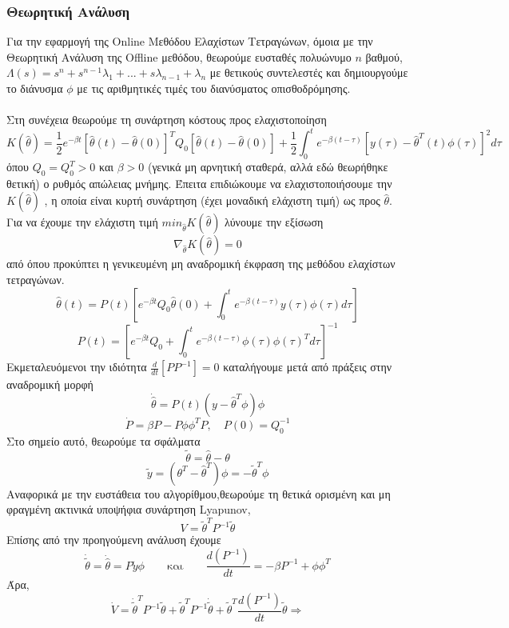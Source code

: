\documentclass[12pt]{article}
\begin{document}
\subsubsection{Θεωρητική Ανάλυση}
Για την εφαρμογή της Online Μεθόδου Ελαχίστων Τετραγώνων, όμοια με την Θεωρητική Ανάλυση της Offline μεθόδου, θεωρούμε ευσταθές πολυώνυμο $n$ βαθμού, $\Lambda(s)=s^{n}+s^{n-1}\lambda_1+...+s\lambda_{n-1}+\lambda_n$ \quad με θετικούς συντελεστές και δημιουργούμε το διάνυσμα $\phi$ με τις αριθμητικές τιμές του διανύσματος οπισθοδρόμησης.
\\ \\
Στη συνέχεια θεωρούμε τη συνάρτηση κόστους προς ελαχιστοποίηση
\[K(\hat{\theta}) = \frac{1}{2}e^{-\beta t}\left[ \hat{\theta}(t)-\hat{\theta}(0) \right]^{T} Q_0 \left[ \hat{\theta}(t)-\hat{\theta}(0) \right] + \frac{1}{2} \int_0^t e^{-\beta (t-\tau)}\left[ y(\tau)- \hat{\theta}^{T}(t) \phi(\tau) \right]^2 d \tau \] 
όπου $Q_0=Q_0^{T} > 0$ και $\beta > 0$ (γενικά μη αρνητική σταθερά, αλλά εδώ θεωρήθηκε θετική) ο ρυθμός απώλειας μνήμης.
Έπειτα επιδιώκουμε να ελαχιστοποιήσουμε την $K(\hat{\theta})$ , η οποία είναι κυρτή συνάρτηση (έχει μοναδική ελάχιστη τιμή) ως προς $\hat{\theta}$.
Για να έχουμε την ελάχιστη τιμή $min_{\hat{\theta}} K(\hat{\theta})$ λύνουμε την εξίσωση
\\ 
\[  \nabla_{\hat{\theta}} K(\hat{\theta}) =0 \]
από όπου προκύπτει η γενικευμένη μη αναδρομική έκφραση της μεθόδου ελαχίστων τετραγώνων.
\[  \hat{\theta}(t) = P(t) \left[e^{-\beta t} Q_0\hat{\theta}(0) + \int_0^t e^{-\beta (t-\tau)} y(\tau)\phi(\tau) d\tau \right]  \]
\[ P(t)= \left[ e^{-\beta t} Q_0 + \int_0^t e^{-\beta (t-\tau)} \phi(\tau) \phi(\tau)^{T} d\tau \right]^{-1} \]
Εκμεταλευόμενοι την ιδιότητα $\frac{d}{dt} \left[ PP^{-1} \right]= 0$ καταλήγουμε μετά από πράξεις στην αναδρομική μορφή
\[ \dot{\hat{\theta}}=P(t) \left( y - \hat{\theta}^{T}\phi \right)\phi \]
\[ \dot{P}=\beta P - P \phi \phi^T P , \quad P(0)=Q_0^{-1} \]
Στο σημείο αυτό, θεωρούμε τα σφάλματα 
\[\tilde{\theta}=\hat{\theta}-\theta\]
\[\tilde{y}=(\theta^{T}-\hat{\theta}^{T})\phi=-\tilde{\theta}^{T}\phi\]
Αναφορικά με την ευστάθεια του αλγορίθμου,θεωρούμε τη θετικά ορισμένη και μη φραγμένη ακτινικά υποψήφια συνάρτηση Lyapunov,
\[ V= \tilde{\theta}^T P^{-1}\tilde{\theta} \]
Επίσης από την προηγούμενη ανάλυση έχουμε
\[ \dot{\tilde{\theta}}=\dot{\hat{\theta}}=P \tilde{y} \phi \qquad \text{και} \qquad  \frac{d \left( P^{-1} \right) }{dt} = -\beta P^{-1}+\phi \phi^{T} \]
Άρα,
\[\dot{V}=\dot{\tilde{\theta}}^T P^{-1}\tilde{\theta}+\tilde{\theta}^T P^{-1} \dot{\tilde{\theta}}+\tilde{\theta}^T \frac{d \left( P^{-1} \right) }{dt}\tilde{\theta} \Rightarrow\]
\end{document}
